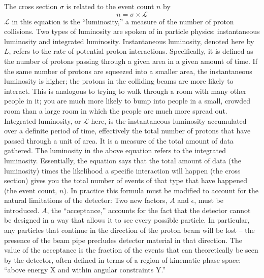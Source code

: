 The cross section $\sigma$ is related to the event count $n$ by 
\[
n = \sigma \times \mathcal{ L }
\]
$\mathcal{ L }$ in this equation is the ``luminosity,'' 
a measure of the number of proton collisions.  
Two types of luminosity are spoken of in particle physics: 
instantaneous luminosity and integrated luminosity.  
Instantaneous luminosity, denoted here by $L$, 
refers to the rate of potential proton interactions.  
Specifically, it is defined as the number of protons 
passing through a given area in a given amount of time.  
If the same number of protons are squeezed into a smaller area, 
the instantaneous luminosity is higher; 
the protons in the colliding beams are more likely to interact.  
This is analogous to trying to walk through a room with many 
other people in it; 
you are much more likely to bump into people in a small, crowded room 
than a large room in which the people are much more spread out.  
Integrated luminosity, or $\mathcal{ L }$ here, 
is the instantaneous luminosity accumulated 
over a definite period of time, 
effectively the total number of protons 
that have passed through a unit of area.  
It is a measure of the total amount of data gathered.  
The luminosity in the above equation refers to 
the integrated luminosity.  
Essentially, the equation says that 
the total amount of data (the luminosity) 
times the likelihood a specific interaction will happen 
(the cross section) 
gives you the total number of events of that type 
that have happened (the event count, $n$).  
In practice this formula must be modified 
to account for the natural limitations of the detector: 
Two new factors, $A$ and $\epsilon$, must be introduced.  
$A$, the ``acceptance,'' accounts for the fact 
that the detector cannot be designed in a way 
that allows it to see every possible particle.  
In particular, any particles that continue 
in the direction of the proton beam will be lost -- 
the presence of the beam pipe precludes 
detector material in that direction.  
The value of the acceptance is the fraction 
of the events that can theoretically 
be seen by the detector, %
often defined in terms of %
a region of kinematic phase space: %
``above energy X and within angular constraints Y.''
